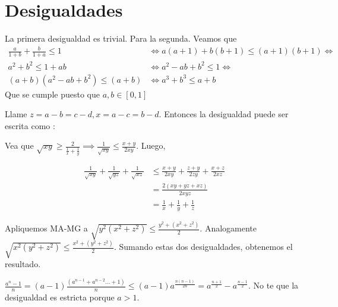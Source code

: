 \section{Desigualdades}

\begin{sol}
	La primera desigualdad es trivial. Para la segunda. Veamos que 
	\begin{align}
	\frac{a}{1+b}+\frac{b}{1+a} \leq 1 &\iff a(a+1) + b(b+1) \leq (a+1)(b+1) \iff \\
	a^2 + b^2 \leq 1+ab &\iff a^2-ab+b^2 \leq 1 \iff \\
	(a+b)(a^2-ab+b^2) \leq (a+b) &\iff a^3+b^3 \leq a+b
	\end{align}
	Que se cumple puesto que $a,b \in [0,1]$
\end{sol}

\begin{sol}
	Llame $z = a-b = c-d, x = a-c=b-d$. Entonces la desigualdad puede ser escrita como :
	
	
\end{sol}


\begin{sol}
	Vea que $\sqrt{xy} \geq \frac{2}{\frac{1}{x}+\frac{1}{y}} \implies \frac{1}{\sqrt{xy}} \leq \frac{x+y}{2xy}$. Luego,
	
	\begin{align}
	\frac{1}{\sqrt{xy}} + \frac{1}{\sqrt{yz}} + \frac{1}{\sqrt{xz}} &\leq \frac{x+y}{2xy} + \frac{z+y}{2zy} + \frac{x+z}{2xz} \\
	& = \frac{2(xy + yz +xz)}{2xyz} \\
	& = \frac{1}{x} + \frac{1}{y} + \frac{1}{z}
	\end{align}
\end{sol}


\begin{sol}
	Apliquemos MA-MG a $\sqrt{y^2(x^2+z^2)} \leq \frac{ y^2 + (x^2+z^2)}{2}$. Analogamente $\sqrt{x^2(y^2+z^2)} \leq \frac{ x^2 + (y^2+z^2)}{2}$. Sumando estas dos desigualdades, obtenemos el resultado.
\end{sol}

\begin{sol}
	$\frac{a^n-1}{n} = (a-1)\frac{(a^{n-1} + a^{n-2} \dots +1 ) }{n}\leq (a-1) a^{\frac{n(n-1)}{2n}} = a^{\frac{n+1}{2}} - a^{\frac{n-1}{2}}$. No te que la desigualdad es estricta porque $a>1$. 
\end{sol}

